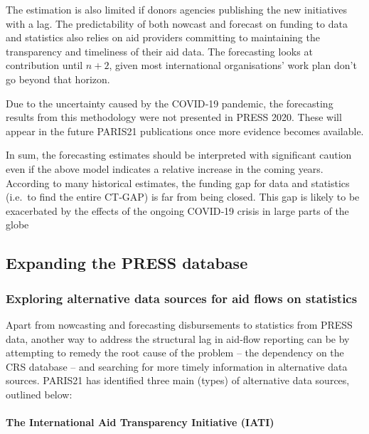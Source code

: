 \documentclass[
]{article}
\begin{document}
The estimation is also limited if donors agencies publishing the new initiatives with a lag. The
predictability of both nowcast and forecast on funding to data and statistics also relies on aid providers
committing to maintaining the transparency and timeliness of their aid data. The forecasting looks at
contribution until \(n+2\), given most international organisations' work plan don't go beyond that
horizon.

Due to the uncertainty caused by the COVID‐19 pandemic, the forecasting results from this
methodology were not presented in PRESS 2020. These will appear in the future PARIS21 publications
once more evidence becomes available.

In sum, the forecasting estimates should be interpreted with significant caution even if the above
model indicates a relative increase in the coming years. According to many historical estimates, the
funding gap for data and statistics (i.e.~to find the entire CT‐GAP) is far from being closed. This gap is
likely to be exacerbated by the effects of the ongoing COVID‐19 crisis in large parts of the globe

\hypertarget{expanding-the-press-database}{%
\subsection{Expanding the PRESS database}\label{expanding-the-press-database}}

\hypertarget{exploring-alternative-data-sources-for-aid-flows-on-statistics}{%
\subsubsection{Exploring alternative data sources for aid flows on statistics}\label{exploring-alternative-data-sources-for-aid-flows-on-statistics}}

Apart from nowcasting and forecasting disbursements to statistics from PRESS data, another way to
address the structural lag in aid‐flow reporting can be by attempting to remedy the root cause of the
problem -- the dependency on the CRS database -- and searching for more timely information in
alternative data sources. PARIS21 has identified three main (types) of alternative data sources,
outlined below:

\hypertarget{the-international-aid-transparency-initiative-iati}{%
\paragraph*{The International Aid Transparency Initiative (IATI)}\label{the-international-aid-transparency-initiative-iati}}
\end{document}
